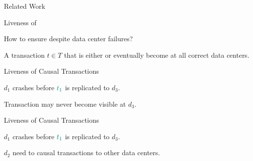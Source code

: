 \begin{frame}{Related Work}
  \begin{center}
  \end{center}


  \vspace{0.30cm}

  \vspace{0.30cm}
\end{frame}

\begin{frame}{Liveness of \unistore}
  \begin{center}
    {How to ensure  despite data center failures?}

    \vspace{0.50cm}
    A transaction $t \in T$ that is either 
    or 
    eventually become  at all correct data centers.
  \end{center}
\end{frame}

\begin{frame}{Liveness of Causal Transactions}
  \begin{center}
    $d_{1}$ crashes before $\textcolor{teal}{t_{1}}$ is replicated to $d_{3}$.

    \vspace{0.20cm}

    \pause
    Transaction  may never become visible at $d_{3}$.
  \end{center}
\end{frame}

\begin{frame}{Liveness of Causal Transactions}
  \begin{center}
    $d_{1}$ crashes before $\textcolor{teal}{t_{1}}$ is replicated to $d_{3}$.

    \vspace{0.20cm}

    \pause
    $d_{2}$ need to  causal transactions to other data centers.
  \end{center}
\end{frame}


